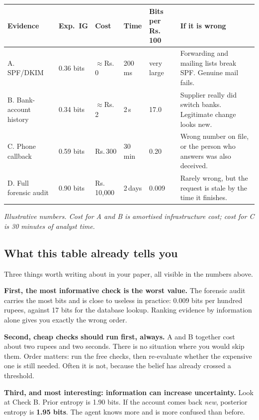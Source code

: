 \documentclass[11pt,a4paper]{article}
\newcommand{\rs}{Rs.\,}
\begin{document}
\begin{center}
\small
\begin{tabular}{@{}L{2.6cm}C{1.5cm}C{1.5cm}C{1.6cm}C{1.9cm}L{4.0cm}@{}}
\toprule
\textbf{Evidence} & \textbf{Exp.\ IG} & \textbf{Cost} & \textbf{Time} & \textbf{Bits per \rs 100} & \textbf{If it is wrong} \\
\midrule
A. SPF/DKIM & 0.36 bits & $\approx$\rs 0 & 200\,ms & very large & Forwarding and mailing lists break SPF. Genuine mail fails. \\[3pt]
B. Bank-account history & 0.34 bits & $\approx$\rs 2 & 2\,s & 17.0 & Supplier really did switch banks. Legitimate change looks new. \\[3pt]
C. Phone callback & 0.59 bits & \rs 300 & 30\,min & 0.20 & Wrong number on file, or the person who answers was also deceived. \\[3pt]
D. Full forensic audit & 0.90 bits & \rs 10{,}000 & 2\,days & 0.009 & Rarely wrong, but the request is stale by the time it finishes. \\
\bottomrule
\end{tabular}
\end{center}

\emph{Illustrative numbers. Cost for A and B is amortised infrastructure cost; cost for C is
30 minutes of analyst time.}

\subsection{What this table already tells you}

Three things worth writing about in your paper, all visible in the numbers above.

\textbf{First, the most informative check is the worst value.} The forensic audit carries the
most bits and is close to useless in practice: 0.009 bits per hundred rupees, against 17 bits
for the database lookup. Ranking evidence by information alone gives you exactly the wrong order.

\textbf{Second, cheap checks should run first, always.} A and B together cost about two rupees and
two seconds. There is no situation where you would skip them. Order matters: run the free checks,
then re-evaluate whether the expensive one is still needed. Often it is not, because the belief
has already crossed a threshold.

\textbf{Third, and most interesting: information can increase uncertainty.} Look at Check B. Prior
entropy is 1.90 bits. If the account comes back \emph{new}, posterior entropy is \textbf{1.95 bits}.
The agent knows more and is more confused than before.
\end{document}
